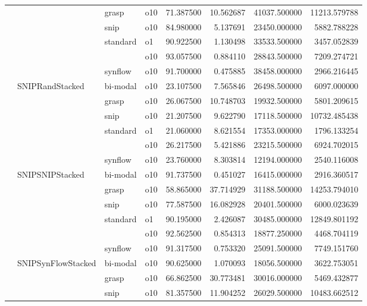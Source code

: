 \begin{longtable}{llllrrrr}
      &     & grasp & o10 &  71.387500 &  10.562687 &     41037.500000 &  11213.579788 \\
      &     & snip & o10 &  84.980000 &   5.137691 &     23450.000000 &   5882.788228 \\
      &     & standard & o1 &  90.922500 &   1.130498 &     33533.500000 &   3457.052839 \\
      &     &         & o10 &  93.057500 &   0.884110 &     28843.500000 &   7209.274721 \\
      &     & synflow & o10 &  91.700000 &   0.475885 &     38458.000000 &   2966.216445 \\
      & SNIPRandStacked & bi-modal & o10 &  23.107500 &   7.565846 &     26498.500000 &   6097.000000 \\
      &     & grasp & o10 &  26.067500 &  10.748703 &     19932.500000 &   5801.209615 \\
      &     & snip & o10 &  21.207500 &   9.622790 &     17118.500000 &  10732.485438 \\
      &     & standard & o1 &  21.060000 &   8.621554 &     17353.000000 &   1796.133254 \\
      &     &         & o10 &  26.217500 &   5.421886 &     23215.500000 &   6924.702015 \\
      &     & synflow & o10 &  23.760000 &   8.303814 &     12194.000000 &   2540.116008 \\
      & SNIPSNIPStacked & bi-modal & o10 &  91.737500 &   0.451027 &     16415.000000 &   2916.360517 \\
      &     & grasp & o10 &  58.865000 &  37.714929 &     31188.500000 &  14253.794010 \\
      &     & snip & o10 &  77.587500 &  16.082928 &     20401.500000 &   6000.023639 \\
      &     & standard & o1 &  90.195000 &   2.426087 &     30485.000000 &  12849.801192 \\
      &     &         & o10 &  92.562500 &   0.854313 &     18877.250000 &   4468.704119 \\
      &     & synflow & o10 &  91.317500 &   0.753320 &     25091.500000 &   7749.151760 \\
      & SNIPSynFlowStacked & bi-modal & o10 &  90.625000 &   1.070093 &     18056.500000 &   3622.753051 \\
      &     & grasp & o10 &  66.862500 &  30.773481 &     30016.000000 &   5469.432877 \\
      &     & snip & o10 &  81.357500 &  11.904252 &     26029.500000 &  10483.662512 \\

\end{longtable}
